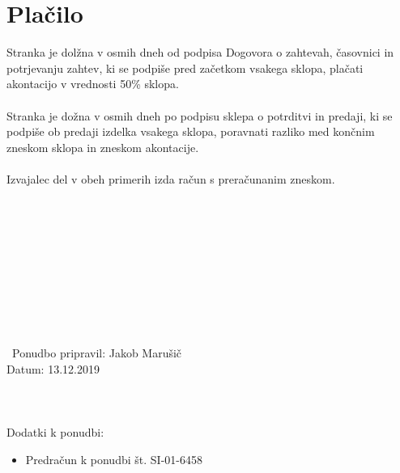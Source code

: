 \documentclass[12pt]{report}
\begin{document}
\section{Plačilo}
Stranka je dolžna v osmih dneh od podpisa Dogovora o zahtevah, časovnici in potrjevanju zahtev, ki se podpiše pred začetkom vsakega sklopa, plačati akontacijo v vrednosti 50\% sklopa.\\\\
Stranka je dožna v osmih dneh po podpisu sklepa o potrditvi in predaji, ki se podpiše ob predaji izdelka vsakega sklopa, poravnati razliko med končnim zneskom sklopa in zneskom akontacije. \\\\
Izvajalec del v obeh primerih izda račun s preračunanim zneskom.\\\\\\\\\\\\\\\\\\\\\\\
Ponudbo pripravil: Jakob Marušič\\
Datum: 13.12.2019\\\\\\\\
Dodatki k ponudbi:
\begin{itemize}
    \item Predračun k ponudbi št. SI-01-6458
\end{itemize}
\end{document}
